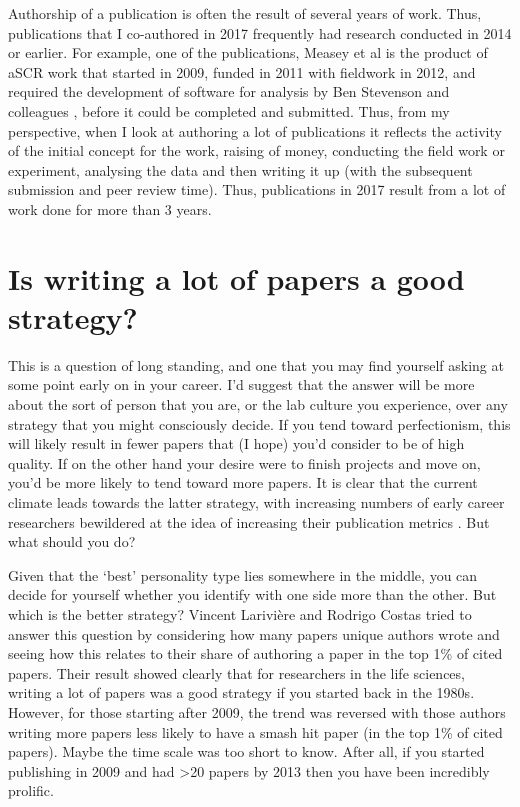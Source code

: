 \documentclass[
]{krantz}
\begin{document}
Authorship of a publication is often the result of several years of work. Thus, publications that I co-authored in 2017 frequently had research conducted in 2014 or earlier. For example, one of the publications, Measey et al \citeyearpar{measey2017counting} is the product of aSCR work that started in 2009, funded in 2011 with fieldwork in 2012, and required the development of software for analysis by Ben Stevenson and colleagues \citeyearpar{stevenson2015general}, before it could be completed and submitted. Thus, from my perspective, when I look at authoring a lot of publications it reflects the activity of the initial concept for the work, raising of money, conducting the field work or experiment, analysing the data and then writing it up (with the subsequent submission and peer review time). Thus, publications in 2017 result from a lot of work done for more than 3 years.

\hypertarget{is-writing-a-lot-of-papers-a-good-strategy}{%
\section{Is writing a lot of papers a good strategy?}\label{is-writing-a-lot-of-papers-a-good-strategy}}

This is a question of long standing, and one that you may find yourself asking at some point early on in your career. I'd suggest that the answer will be more about the sort of person that you are, or the lab culture you experience, over any strategy that you might consciously decide. If you tend toward perfectionism, this will likely result in fewer papers that (I hope) you'd consider to be of high quality. If on the other hand your desire were to finish projects and move on, you'd be more likely to tend toward more papers. It is clear that the current climate leads towards the latter strategy, with increasing numbers of early career researchers bewildered at the idea of increasing their publication metrics \citep{helmer2020what}. But what should you do?

Given that the `best' personality type lies somewhere in the middle, you can decide for yourself whether you identify with one side more than the other. But which is the better strategy? Vincent Larivière and Rodrigo Costas \citeyearpar{lariviere2016how} tried to answer this question by considering how many papers unique authors wrote and seeing how this relates to their share of authoring a paper in the top 1\% of cited papers. Their result showed clearly that for researchers in the life sciences, writing a lot of papers was a good strategy if you started back in the 1980s. However, for those starting after 2009, the trend was reversed with those authors writing more papers less likely to have a smash hit paper (in the top 1\% of cited papers). Maybe the time scale was too short to know. After all, if you started publishing in 2009 and had \textgreater20 papers by 2013 then you have been incredibly prolific.
\end{document}
